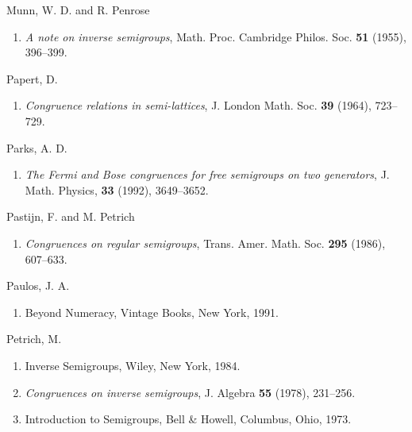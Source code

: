 \documentclass{surv-l}
\numberwithin{equation}{section}
\numberwithin{table}{section}
\numberwithin{figure}{section}
\theoremstyle{plain}
\theoremstyle{definition}
\begin{document}
\begin{thebibliography}{}
\item[] Munn, W. D. and R. Penrose
\begin{enumerate}
\item \label{bib55} \emph{A note on inverse semigroups}, Math. Proc.
Cambridge Philos. Soc. \textbf{51} (1955), 396--399.
\end{enumerate}

\item[] Papert, D.
\begin{enumerate}
\item \label{bib56} \emph{Congruence relations in semi-lattices}, J.
London Math. Soc. \textbf{39} (1964), 723--729.
\end{enumerate}

\item[] Parks, A. D.
\begin{enumerate}
\item \label{bib57} \emph{The Fermi and Bose congruences for free
semigroups on two generators}, J. Math. Physics,
\textbf{33} (1992), 3649--3652.
\end{enumerate}

\item[] Pastijn, F. and M. Petrich
\begin{enumerate}
\item \label{bib58} \emph{Congruences on regular semigroups}, Trans. Amer.
Math. Soc. \textbf{295} (1986), 607--633.
\end{enumerate}

\item[] Paulos, J. A.
\begin{enumerate}
\item \label{bib59} Beyond Numeracy, Vintage Books, New York, 1991.
\end{enumerate}

\item[] Petrich, M.
\begin{enumerate}
\item \label{bib60} Inverse Semigroups, Wiley, New York, 1984.

\item \label{bib60a} \emph{Congruences on inverse semigroups}, J. Algebra
\textbf{55} (1978), 231--256.

\item \label{bib60b} Introduction to Semigroups, Bell \& Howell, Columbus,
Ohio, 1973.
\end{enumerate}


\end{thebibliography}
\end{document}
